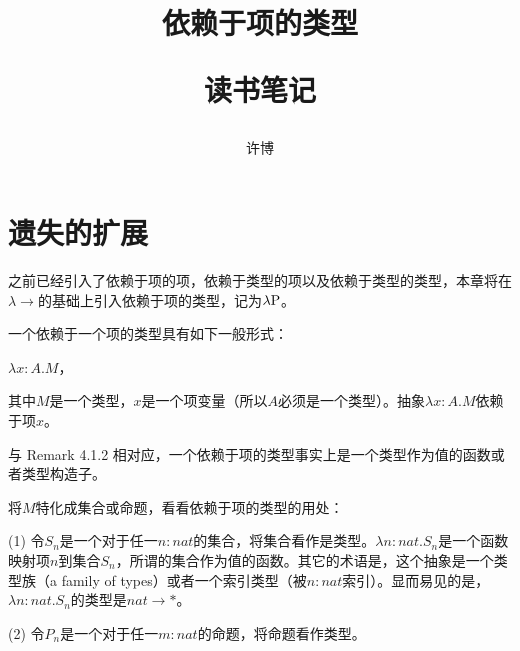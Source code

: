 \documentclass[UTF8]{article}
\title{依赖于项的类型\\[2ex]\begin{large}读书笔记\end{large}}
\author{许博}
\date{}
\begin{document}
\maketitle
	\section{遗失的扩展}
		之前已经引入了依赖于项的项，依赖于类型的项以及依赖于类型的类型，本章将在$\lambda{\rightarrow}$的基础上引入依赖于项的类型，记为$\lambda{\rm P}$。
		
		一个依赖于一个项的类型具有如下一般形式：
		
		\begin{center}
			$\lambda x:A.M$，
		\end{center}
	
		其中$M$是一个类型，$x$是一个项变量（所以$A$必须是一个类型）。抽象$\lambda x:A.M$依赖于项$x$。
		
		与 Remark 4.1.2 相对应，一个依赖于项的类型事实上是一个类型作为值的函数或者类型构造子。
		
		将$M$特化成集合或命题，看看依赖于项的类型的用处：
		
		(1) 令$S_n$是一个对于任一$n:nat$的集合，将集合看作是类型。$\lambda n:nat.S_n$是一个函数映射项$n$到集合$S_n$，所谓的集合作为值的函数。其它的术语是，这个抽象是一个类型族（a family of types）或者一个索引类型（被$n:nat$索引）。显而易见的是，$\lambda n:nat.S_n$的类型是$nat\rightarrow*$。
		
		(2) 令$P_n$是一个对于任一$m:nat$的命题，将命题看作类型。
\end{document}
